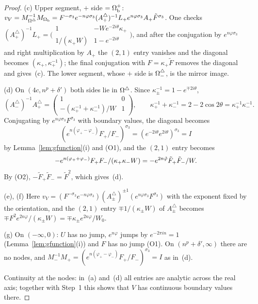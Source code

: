 \begin{proof}
(c) Upper segment, $+$ side $=\Omega_{\mathrm{b}}^+$: $v_V=M_{\Omega^{\triangle}}^{-1}M_{\Omega_{\mathrm{b}}}=F^{-\sigma_3}e^{-n\varphi\sigma_3}(A^\triangle_+)^{-1}L_+
e^{n\varphi\sigma_3}A_+\tilde F^{\sigma_3}$. One checks $(A^\triangle_+)^{-1}L_+=\bigl(\begin{smallmatrix}1&-We^{-2i\theta}
\kappa_+\\1/(\kappa_+W)&1-e^{-2i\theta}\end{smallmatrix}\bigr)$, and after the conjugation by $e^{n\varphi\sigma_3}$ and right
multiplication by $A_+$ the $(2,1)$ entry vanishes and the diagonal becomes $(\kappa_+,\kappa_+^{-1})$; the final
conjugation with $F=\kappa_+\tilde F$ removes the diagonal and gives~(c). The lower segment, whose $+$ side is $\Omega^{\triangle}_-$,
is the mirror image.

(d) On $(4c,n^p+\delta')$ both sides lie in $\Omega^{\triangle}$. Since $\kappa_\pm^{-1}=1-e^{\mp2i\theta}$,
\[
  (A^\triangle_-)^{-1}A^\triangle_+=\begin{pmatrix}1&0\\-(\kappa_+^{-1}+\kappa_-^{-1})/W&1\end{pmatrix},\qquad
  \kappa_+^{-1}+\kappa_-^{-1}=2-2\cos2\theta=\kappa_+^{-1}\kappa_-^{-1}.
\]
Conjugating by $e^{n\varphi\sigma_3}F^{\sigma_3}$ with boundary values, the diagonal becomes
\[
  (e^{n(\varphi_+-\varphi_-)}F_+/F_-)^{\sigma_3}=(e^{-2i\theta}e^{2i\theta})^{\sigma_3}=I
\]
by Lemma~\ref{lem:gfunction}(i) and (O1), and the $(2,1)$ entry becomes
\[
  -e^{n(\varphi_++\varphi_-)}F_+F_-/(\kappa_+\kappa_-W)=-e^{2n\tilde\varphi}\tilde F_+\tilde F_-/W .
\]
By (O2), $-\tilde F_+\tilde F_-=\tilde F^2$, which gives~(d).

(e), (f) Here $v_V=(F^{-\sigma_3}e^{-n\varphi\sigma_3})(A^\triangle_\pm)^{\pm1}(e^{n\varphi\sigma_3}F^{\sigma_3})$ with the
exponent fixed by the orientation, and the $(2,1)$ entry $\mp1/(\kappa_\pm W)$ of $A^\triangle_\pm$ becomes
$\mp F^2e^{2n\varphi}/(\kappa_\pm W)=\mp\kappa_\pm e^{2n\varphi}/W_0$.

(g) On $(-\infty,0)$: $U$ has no jump, $e^{n\varphi}$ jumps by $e^{-2\pi in}=1$ (Lemma~\ref{lem:gfunction}(i)) and $F$ has no
jump (O1). On $(n^p+\delta',\infty)$ there are no nodes, and $M_-^{-1}M_+=(e^{n(\varphi_+-\varphi_-)}F_+/F_-)^{\sigma_3}=I$ as
in~(d).

Continuity at the nodes: in~(a) and~(d) all entries are analytic across the real axis; together with Step~1 this shows
that $V$ has continuous boundary values there.
\end{proof}
